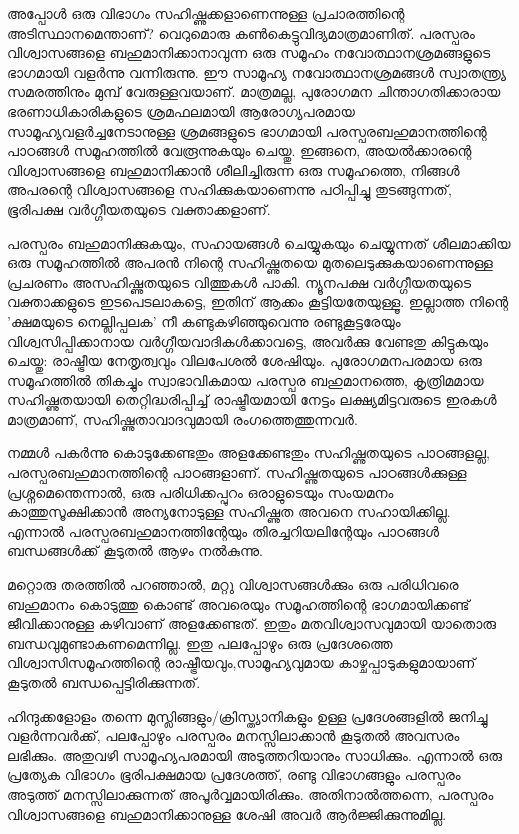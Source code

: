 അപ്പോള്‍ ഒരു വിഭാഗം സഹിഷ്ണുക്കളാണെന്നുള്ള പ്രചാരത്തിന്റെ അടിസ്ഥാനമെന്താണ്? വെറുമൊരു കണ്‍കെട്ടുവിദ്യമാത്രമാണിത്. 
പരസ്പരം വിശ്വാസങ്ങളെ ബഹുമാനിക്കാനാവുന്ന ഒരു സമൂഹം നവോത്ഥാനശ്രമങ്ങളുടെ ഭാഗമായി വളര്‍ന്നു വന്നിരുന്നു. ഈ സാമൂഹ്യ 
നവോത്ഥാനശ്രമങ്ങള്‍ സ്വാതന്ത്ര്യ സമരത്തിനും മുമ്പ് വേരുള്ളവയാണ്. മാത്രമല്ല, പുരോഗമന ചിന്താഗതിക്കാരായ ഭരണാധികാരികളുടെ
 ശ്രമഫലമായി ആരോഗ്യപരമായ സാമൂഹ്യവളര്‍ച്ചനേടാനുള്ള ശ്രമങ്ങളുടെ ഭാഗമായി പരസ്പരബഹുമാനത്തിന്റെ പാഠങ്ങള്‍ സമൂഹത്തില്‍ 
 വേരൂന്നുകയും ചെയ്തു. ഇങ്ങനെ, അയല്‍ക്കാരന്റെ വിശ്വാസങ്ങളെ ബഹുമാനിക്കാന്‍ ശീലിച്ചിരുന്ന ഒരു സമൂഹത്തെ, നിങ്ങള്‍ 
 അപരന്റെ വിശ്വാസങ്ങളെ സഹിക്കുകയാണെന്നു പഠിപ്പിച്ചു തുടങ്ങുന്നത്, ഭൂരിപക്ഷ വര്‍ഗ്ഗീയതയുടെ വക്താക്കളാണ്.

പരസ്പരം ബഹുമാനിക്കുകയും, സഹായങ്ങള്‍ ചെയ്യുകയും ചെയ്യുന്നത് ശീലമാക്കിയ ഒരു സമൂഹത്തില്‍ അപരന്‍ നിന്റെ സഹിഷ്ണുതയെ 
മുതലെടുക്കുകയാണെന്നുള്ള പ്രചരണം അസഹിഷ്ണുതയുടെ വിത്തുകള്‍ പാകി. ന്യൂനപക്ഷ വര്‍ഗ്ഗീയതയുടെ വക്താക്കളുടെ ഇടപെടലാകട്ടെ, 
ഇതിന് ആക്കം കൂട്ടിയതേയുള്ളൂ. ഇല്ലാത്ത നിന്റെ 'ക്ഷമയുടെ നെല്ലിപ്പലക' നീ കണ്ടുകഴിഞ്ഞുവെന്നു രണ്ടുകൂട്ടരേയും വിശ്വസിപ്പിക്കാനായ
 വര്‍ഗ്ഗീയവാദികള്‍ക്കാവട്ടെ, അവര്‍ക്കു വേണ്ടതു കിട്ടുകയും ചെയ്തു: രാഷ്ട്രീയ നേതൃത്വവും വിലപേശല്‍ ശേഷിയും. പുരോഗമനപരമായ
  ഒരു സമൂഹത്തില്‍ തികച്ചും സ്വാഭാവികമായ പരസ്പര ബഹുമാനത്തെ, കൃത്രിമമായ സഹിഷ്ണുതയായി തെറ്റിദ്ധരിപ്പിച്ച് രാഷ്ട്രീയമായി 
  നേട്ടം ലക്ഷ്യമിട്ടവരുടെ ഇരകള്‍ മാത്രമാണ്, സഹിഷ്ണുതാവാദവുമായി രംഗത്തെത്തുന്നവര്‍.

നമ്മള്‍ പകര്‍ന്നു കൊടുക്കേണ്ടതും അളക്കേണ്ടതും സഹിഷ്ണുതയുടെ പാഠങ്ങളല്ല, പരസ്പരബഹുമാനത്തിന്റെ പാഠങ്ങളാണ്. സഹിഷ്ണുതയുടെ 
പാഠങ്ങള്‍ക്കുള്ള പ്രശ്നമെന്തെന്നാല്‍, ഒരു പരിധിക്കപ്പുറം ഒരാളുടെയും സംയമനം കാത്തുസൂക്ഷിക്കാന്‍ അന്യനോടുള്ള സഹിഷ്ണുത 
അവനെ സഹായിക്കില്ല. എന്നാല്‍ പരസ്പരബഹുമാനത്തിന്റേയും തിരച്ചറിയലിന്റേയും പാഠങ്ങള്‍ ബന്ധങ്ങള്‍ക്ക് കൂടുതല്‍ ആഴം നല്‍കുന്നു.

മറ്റൊരു തരത്തില്‍ പറഞ്ഞാല്‍, മറ്റു വിശ്വാസങ്ങള്‍ക്കും ഒരു പരിധിവരെ ബഹുമാനം കൊടുത്തു കൊണ്ട് അവരെയും സമൂഹത്തിന്റെ 
ഭാഗമായിക്കണ്ട് ജീവിക്കാനുള്ള കഴിവാണ് അളക്കേണ്ടത്. ഇതും മതവിശ്വാസവുമായി യാതൊരു ബന്ധവുമുണ്ടാകണമെന്നില്ല. ഇതു 
പലപ്പോഴും ഒരു പ്രദേശത്തെ വിശ്വാസിസമൂഹത്തിന്റെ രാഷ്ട്രീയവും,സാമൂഹ്യവുമായ കാഴ്ചപ്പാടുകളുമായാണ് കൂടുതല്‍ ബന്ധപ്പെട്ടിരിക്കുന്നത്.

ഹിന്ദുക്കളോളം തന്നെ മുസ്ലിങ്ങളും/ക്രിസ്ത്യാനികളും ഉള്ള പ്രദേശങ്ങളില്‍ ജനിച്ചു വളര്‍ന്നവര്‍ക്ക്, പലപ്പോഴും പരസ്പരം മനസ്സിലാക്കാന്‍ 
കൂടുതല്‍ അവസരം ലഭിക്കും. അതുവഴി സാമൂഹ്യപരമായി അടുത്തറിയാനും സാധിക്കും. എന്നാല്‍ ഒരു പ്രത്യേക വിഭാഗം ഭൂരിപക്ഷമായ
 പ്രദേശത്ത്, രണ്ടു വിഭാഗങ്ങളും പരസ്പരം അടുത്ത് മനസ്സിലാക്കുന്നത് അപൂര്‍വ്വമായിരിക്കും. അതിനാല്‍ത്തന്നെ, പരസ്പരം വിശ്വാസങ്ങളെ
  ബഹുമാനിക്കാനുള്ള ശേഷി അവര്‍ ആര്‍ജ്ജിക്കുന്നുമില്ല.

